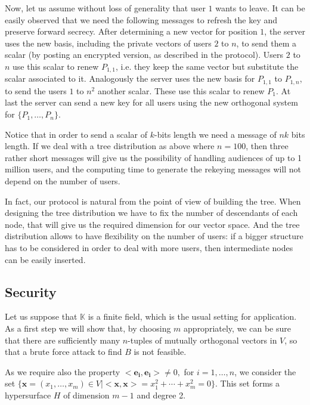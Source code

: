 \documentclass[a4paper,11pt]{amsart}
\theoremstyle{definition}
\newcommand{\K}{\mathbb{K}}
\begin{document}
Now, let us assume without loss of generality that user $1$ wants to
leave. It can be easily observed that we need the following messages
to refresh the key and preserve forward secrecy.  After determining a
new vector for position $1$, the server uses the new basis, including
the private vectors of users $2$ to $n$, to send them a scalar (by
posting an encrypted version, as described in the protocol). Users $2$
to $n$ use this scalar to renew $P_{1,1}$, i.e. they keep the same
vector but substitute the scalar associated to it. Analogously the
server uses the new basis for $P_{1,1}$ to $P_{1,n}$, to send the
users $1$ to $n^2$ another scalar. These use this scalar to renew
$P_{1}$. At last the server can send a new key for all users using the
new orthogonal system for $\{ P_1, \dots ,P_n \}$.

Notice that in order to send a scalar of $k$-bits length we need a
message of $nk$ bits length. If we deal with a tree distribution as
above where $n=100$, then three rather short messages will give us the
possibility of handling audiences of up to 1 million users, and the
computing time to generate the rekeying messages will not depend on
the number of users.








In fact, our protocol is natural from the point of view of building
the tree. When designing the tree distribution we have to fix the
number of descendants of each node, that will give us the required
dimension for our vector space.  And the tree distribution allows to
have flexibility on the number of users: if a bigger structure has to
be considered in order to deal with more users, then intermediate
nodes can be easily inserted.





\subsection{Security}


Let us suppose that $\K$ is a finite field, which is the usual setting for application. As a first step we will show that, by choosing $m$ appropriately, we
can be sure that there are sufficiently many $n$-tuples of mutually
orthogonal vectors in $V$, so that a brute force attack to find $B$ is
not feasible.

As we require also the property $<\mathbf{e_i},\mathbf{e_i}>\neq 0,$ for
$i=1,\ldots,n$, we consider the set 
$\{\mathbf{x}=(x_1,\ldots,x_m)\in V |
<\mathbf{x},\mathbf{x}>=x_1^2+\cdots+x_m^2=0\}$. This set forms a hypersurface $H$ of
dimension $m-1$ and degree 2.
\end{document}
